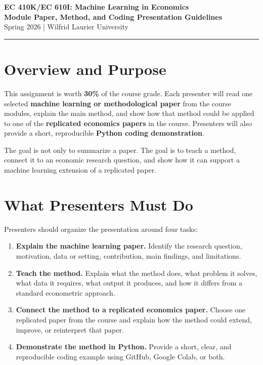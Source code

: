 \documentclass[11pt]{article}
\newcommand{\coloredsection}[1]{\vspace{2pt}\section*{\large\textcolor{sectioncolor}{#1}}\vspace{-2pt}}
\begin{document}

\begin{center}
    {\LARGE \textbf{\textcolor{sectioncolor}{EC 410K/EC 610I: Machine Learning in Economics}}}\\[4pt]
    {\large \textbf{Module Paper, Method, and Coding Presentation Guidelines}}\\[3pt]
    {\normalsize Spring 2026 | Wilfrid Laurier University}
\end{center}

\vspace{6pt}
\hrule
\vspace{10pt}

\coloredsection{Overview and Purpose}

This assignment is worth \textbf{30\%} of the course grade. Each presenter will read one selected \textbf{machine learning or methodological paper} from the course modules, explain the main method, and show how that method could be applied to one of the \textbf{replicated economics papers} in the course. Presenters will also provide a short, reproducible \textbf{Python coding demonstration}.

\vspace{5pt}
\noindent The goal is not only to summarize a paper. The goal is to teach a method, connect it to an economic research question, and show how it can support a machine learning extension of a replicated paper.

\coloredsection{What Presenters Must Do}

Presenters should organize the presentation around four tasks:

\begin{enumerate}
    \item \textbf{Explain the machine learning paper.} Identify the research question, motivation, data or setting, contribution, main findings, and limitations.
    \item \textbf{Teach the method.} Explain what the method does, what problem it solves, what data it requires, what output it produces, and how it differs from a standard econometric approach.
    \item \textbf{Connect the method to a replicated economics paper.} Choose one replicated paper from the course and explain how the method could extend, improve, or reinterpret that paper.
    \item \textbf{Demonstrate the method in Python.} Provide a short, clear, and reproducible coding example using GitHub, Google Colab, or both.
\end{enumerate}
\end{document}
